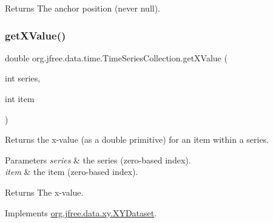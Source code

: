 \begin{DoxyReturn}{Returns}
The anchor position (never {\ttfamily null}). 
\end{DoxyReturn}
\mbox{\label{classorg_1_1jfree_1_1data_1_1time_1_1_time_series_collection_af4c7434196da5c1658c8eb7e24580733}} 
\subsubsection{\texorpdfstring{get\+X\+Value()}{getXValue()}}
{\footnotesize\ttfamily double org.\+jfree.\+data.\+time.\+Time\+Series\+Collection.\+get\+X\+Value (\begin{DoxyParamCaption}\item[{int}]{series,  }\item[{int}]{item }\end{DoxyParamCaption})}

Returns the x-\/value (as a double primitive) for an item within a series.


\begin{DoxyParams}{Parameters}
{\em series} & the series (zero-\/based index). \\
\hline
{\em item} & the item (zero-\/based index).\\
\hline
\end{DoxyParams}
\begin{DoxyReturn}{Returns}
The x-\/value. 
\end{DoxyReturn}


Implements \mbox{\hyperlink{interfaceorg_1_1jfree_1_1data_1_1xy_1_1_x_y_dataset_a65bd212539d8f7dfb3d3d36b5f42e083}{org.\+jfree.\+data.\+xy.\+X\+Y\+Dataset}}.

\mbox{\label{classorg_1_1jfree_1_1data_1_1time_1_1_time_series_collection_a43ff1a03fa8e1f41ad1e1f611b9d28fb}} 
